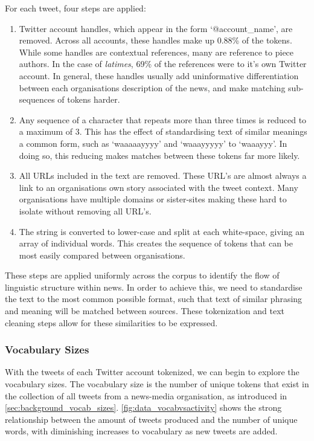 For each tweet, four steps are applied:
\begin{enumerate}
	\item Twitter account handles, which appear in the form `@account\_name', are removed. Across all accounts, these handles make up 0.88\% of the tokens. While some handles are contextual references, many are reference to piece authors. In the case of \emph{latimes}, 69\% of the references were to it's own Twitter account. In general, these handles usually add uninformative differentiation between each organisations description of the news, and make matching sub-sequences of tokens harder.
	\item Any sequence of a character that repeats more than three times is reduced to a maximum of 3. This has the effect of standardising text of similar meanings a common form, such as `waaaaayyyy' and `waaayyyyy' to `waaayyy'. In doing so, this reducing makes matches between these tokens far more likely.
	\item All URLs included in the text are removed. These URL's are almost always a link to an organisations own story associated with the tweet context. Many organisations have multiple domains or sister-sites making these hard to isolate without removing all URL's.  
	\item The string is converted to lower-case and split at each white-space, giving an array of individual words. This creates the sequence of tokens that can be most easily compared between organisations.
\end{enumerate}

These steps are applied uniformly across the corpus to identify the flow of linguistic structure within news. In order to achieve this, we need to standardise the text to the most common possible format, such that text of similar phrasing and meaning will be matched between sources. These tokenization and text cleaning steps allow for these similarities to be expressed.


\subsubsection{Vocabulary Sizes}\label{sec:vocabsizes}

With the tweets of each Twitter account tokenized, we can begin to explore the vocabulary sizes. The vocabulary size is the number of unique tokens that exist in the collection of all tweets from a news-media organisation, as introduced in \autoref{sec:background_vocab_sizes}. \autoref{fig:data_vocabvsactivity} shows the strong relationship between the amount of tweets produced and the number of unique words, with diminishing increases to vocabulary as new tweets are added.

